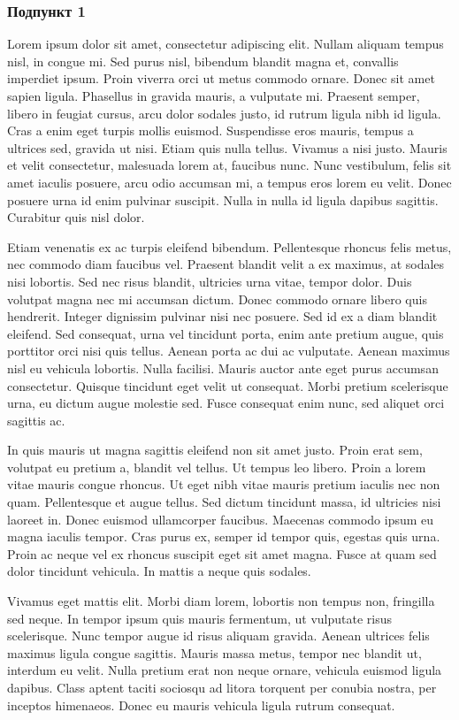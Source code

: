 \subsubsection{Подпункт 1}
Lorem ipsum dolor sit amet, consectetur adipiscing elit. Nullam aliquam tempus nisl, in congue mi. Sed purus nisl, bibendum blandit magna et, convallis imperdiet ipsum. Proin viverra orci ut metus commodo ornare. Donec sit amet sapien ligula. Phasellus in gravida mauris, a vulputate mi. Praesent semper, libero in feugiat cursus, arcu dolor sodales justo, id rutrum ligula nibh id ligula. Cras a enim eget turpis mollis euismod. Suspendisse eros mauris, tempus a ultrices sed, gravida ut nisi. Etiam quis nulla tellus. Vivamus a nisi justo. Mauris et velit consectetur, malesuada lorem at, faucibus nunc. Nunc vestibulum, felis sit amet iaculis posuere, arcu odio accumsan mi, a tempus eros lorem eu velit. Donec posuere urna id enim pulvinar suscipit. Nulla in nulla id ligula dapibus sagittis. Curabitur quis nisl dolor.
\par
Etiam venenatis ex ac turpis eleifend bibendum. Pellentesque rhoncus felis metus, nec commodo diam faucibus vel. Praesent blandit velit a ex maximus, at sodales nisi lobortis. Sed nec risus blandit, ultricies urna vitae, tempor dolor. Duis volutpat magna nec mi accumsan dictum. Donec commodo ornare libero quis hendrerit. Integer dignissim pulvinar nisi nec posuere. Sed id ex a diam blandit eleifend. Sed consequat, urna vel tincidunt porta, enim ante pretium augue, quis porttitor orci nisi quis tellus. Aenean porta ac dui ac vulputate. Aenean maximus nisl eu vehicula lobortis. Nulla facilisi. Mauris auctor ante eget purus accumsan consectetur. Quisque tincidunt eget velit ut consequat. Morbi pretium scelerisque urna, eu dictum augue molestie sed. Fusce consequat enim nunc, sed aliquet orci sagittis ac.
\par
In quis mauris ut magna sagittis eleifend non sit amet justo. Proin erat sem, volutpat eu pretium a, blandit vel tellus. Ut tempus leo libero. Proin a lorem vitae mauris congue rhoncus. Ut eget nibh vitae mauris pretium iaculis nec non quam. Pellentesque et augue tellus. Sed dictum tincidunt massa, id ultricies nisi laoreet in. Donec euismod ullamcorper faucibus. Maecenas commodo ipsum eu magna iaculis tempor. Cras purus ex, semper id tempor quis, egestas quis urna. Proin ac neque vel ex rhoncus suscipit eget sit amet magna. Fusce at quam sed dolor tincidunt vehicula. In mattis a neque quis sodales.
\par
Vivamus eget mattis elit. Morbi diam lorem, lobortis non tempus non, fringilla sed neque. In tempor ipsum quis mauris fermentum, ut vulputate risus scelerisque. Nunc tempor augue id risus aliquam gravida. Aenean ultrices felis maximus ligula congue sagittis. Mauris massa metus, tempor nec blandit ut, interdum eu velit. Nulla pretium erat non neque ornare, vehicula euismod ligula dapibus. Class aptent taciti sociosqu ad litora torquent per conubia nostra, per inceptos himenaeos. Donec eu mauris vehicula ligula rutrum consequat.
